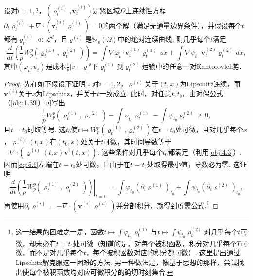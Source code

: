 \begin{theorem}\label{obj:5.24}
设对$i=1,2$，$(\varrho_t^{(i)},\mathbf v_t^{(i)})$是紧区域$\Omega$上连续性方程$\partial_t\varrho_t^{(i)}+\nabla\cdot(\mathbf v_t^{(i)}\varrho_t^{(i)})=0$的两个解（满足无通量边界条件），并假设每个$t$都有$\varrho_t^{(i)}\ll\mathscr L^d$，且$\varrho^{(i)}$是$\mathbb W_p(\Omega)$中的绝对连续曲线. 则几乎每个$t$满足
\[
\frac d{dt}\left(\frac1pW_p^p(\varrho_t^{(1)},\varrho_t^{(2)})\right)
=\int\nabla\varphi_t\cdot\mathbf v_t^{(1)}\varrho_t^{(1)}\,dx
+\int\nabla\psi_t\cdot\mathbf v_t^{(2)}\varrho_t^{(2)}\,dx,
\]
其中$(\varphi_t,\psi_t)$是成本$\frac1p|x-y|^p$下$\varrho_t^{(1)}$到$\varrho_t^{(2)}$运输中的任意一对Kantorovich势.
\end{theorem}
\begin{proof}
先在如下假设下证明：对$i=1,2$，$\varrho^{(i)}$关于$(t,x)$为Lipschitz连续，而$\mathbf v^{(i)}$关于$x$为Lipschitz，并关于$t$一致成立. 此时，对任意$t,t_0$，由对偶公式（\autoref{obj:1.39}）可写出
\begin{equation}\label{eq:5.6}
\frac1pW_p^p(\varrho_t^{(1)},\varrho_t^{(2)})
-\int\varphi_{t_0}\varrho_t^{(1)}-\int\psi_{t_0}\varrho_t^{(2)}\ge0,
\end{equation}
且$t=t_0$时取等号. 选$t_0$使$t\mapsto W_p^p(\varrho_t^{(1)},\varrho_t^{(2)})$在$t=t_0$处可微，且对几乎每个$x$，$\varrho^{(i)}(t,x)$在$(t_0,x)$处关于$t$可微，其时间导数等于$-\nabla\cdot(\varrho^{(i)}(t,x)\mathbf v^i(t,x))$. 这些条件对几乎每个$t_0$都满足（利用\autoref{obj:4.3}）. 因而\eqref{eq:5.6}左端在$t=t_0$处可微，且由于在$t=t_0$处取得最小值，导数必为零. 这证明
\[
\left.\frac d{dt}\left(\frac1pW_p^p(\varrho_t^{(1)},\varrho_t^{(2)})\right)\right|_{t=t_0}
=\int\varphi_{t_0}(\partial_t\varrho^{(1)})_{t_0}
+\int\psi_{t_0}(\partial_t\varrho^{(2)})_{t_0},
\]
再使用$\partial_t\varrho^{(i)}=-\nabla\cdot(\mathbf v^{(i)}\varrho^{(i)})$并分部积分，就得到所需公式.\footnote{这一结果的困难之一是，函数$t\mapsto\int\varphi_{t_0}\varrho_t^{(1)}$与$t\mapsto\int\psi_{t_0}\varrho_t^{(2)}$对几乎每个$t$可微，却未必在$t=t_0$处可微（知道的是，对每个被积函数，积分对几乎每个$T$可微，而不是对几乎每个$t$，每个被积函数对应的积分都可微）. 这里提出通过Lipschitz解克服这一困难的方法. 另一种做法是，像基于\cite{b15}思想的\cite{b155}那样，尝试找出使每个被积函数均对应可微积分的确切时刻集合.}


\end{proof}
